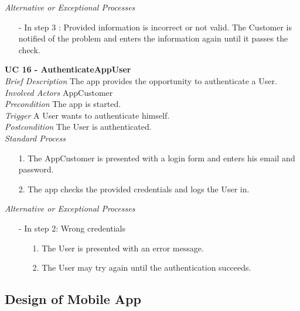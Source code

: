 \textit{Alternative or Exceptional Processes}
\begin{itemize}
	\item[-] In step 3 : Provided information is incorrect or not valid. The Customer is	notified of the problem and enters the information again until it passes the check.	
\end{itemize}

\textbf{UC 16 - AuthenticateAppUser}\\ \newline
\textit{Brief Description} The app provides the opportunity to authenticate a User.\\ \newline
\textit{Involved Actors} AppCustomer\\ \newline
\textit{Precondition} The app is started.\\ \newline
\textit{Trigger} A User wants to authenticate himself.\\ \newline
\textit{Postcondition} The User is authenticated.\\ \newline
\textit{Standard Process}
\begin{itemize}[leftmargin=*]
	\item[1.] The AppCustomer is presented with a login form and enters his email and password.
	\item[2.] The app checks the provided credentials and logs the User in.
\end{itemize}

\textit{Alternative or Exceptional Processes}
\begin{itemize}
	\item[-] In step 2: Wrong credentials
	\begin{itemize}
		\item[1.] The User is presented with an error message.
		\item[2.] The User may try again until the authentication succeeds.
	\end{itemize}
\end{itemize}




\subsection{Design of Mobile App}\label{DesignMobileApp}



